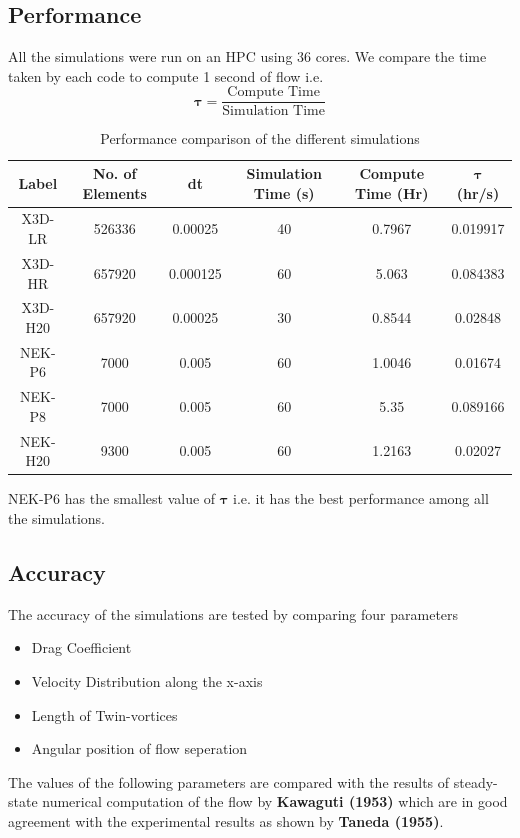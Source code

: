 \documentclass[11pt]{article}
\begin{document}
\subsection{Performance}
All the simulations were run on an HPC using 36 cores. We compare the time taken by
each code to compute 1 second of flow i.e.
$$
    \mathbf{\tau} = \frac{\text{Compute Time}}{\text{Simulation Time}}
$$
\begin{table}[H]
    \caption{Performance comparison of the different simulations}
    \begin{tabular}{|c|c|c|c|c|c|}
        \hline
        \textbf{Label} & \textbf{No. of Elements} & \textbf{dt} & \textbf{Simulation Time (s)} & \textbf{Compute Time (Hr)} & $\mathbf{\tau}$ \textbf{(hr/s)} \\
        \hline
        X3D-LR         & 526336                   & 0.00025     & 40                           & 0.7967                     & 0.019917                        \\
        \hline
        X3D-HR         & 657920                   & 0.000125    & 60                           & 5.063                      & 0.084383                        \\
        \hline
        X3D-H20        & 657920                   & 0.00025     & 30                           & 0.8544                     & 0.02848                         \\
        \hline
        NEK-P6         & 7000                     & 0.005       & 60                           & 1.0046                     & 0.01674                         \\
        \hline
        NEK-P8         & 7000                     & 0.005       & 60                           & 5.35                       & 0.089166                        \\
        \hline
        NEK-H20        & 9300                     & 0.005       & 60                           & 1.2163                     & 0.02027                         \\
        \hline
    \end{tabular}
\end{table}
\noindent NEK-P6 has the smallest value of $\mathbf{\tau}$ i.e. it has the best performance among all the simulations.
\newpage
\subsection{Accuracy}
The accuracy of the simulations are tested by comparing four parameters
\begin{itemize}
    \item Drag Coefficient
    \item Velocity Distribution along the x-axis
    \item Length of Twin-vortices
    \item Angular position of flow seperation
\end{itemize}
The values of the following parameters are compared with the results of steady-state numerical computation
of the flow by \textbf{Kawaguti (1953)} which are in good agreement with the experimental results as shown by
\textbf{Taneda (1955)}.
\end{document}
